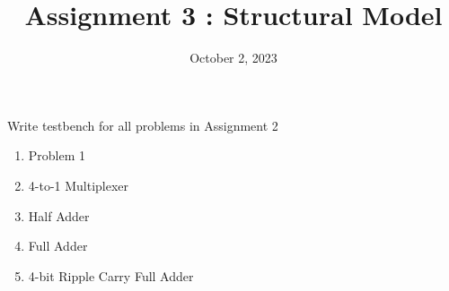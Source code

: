 \documentclass{vhdl-assignment}
\title{Assignment 3 : Structural Model}
\date{October 2, 2023}
\begin{document}
\maketitle
\thispagestyle{fancy}

\begin{problem}{Write testbench for all problems in Assignment 2}
    \begin{enumerate}
        \item Problem 1 
        \item 4-to-1 Multiplexer
        \item Half Adder
        \item Full Adder
        \item 4-bit Ripple Carry Full Adder
    \end{enumerate}
\end{problem}
\end{document}
